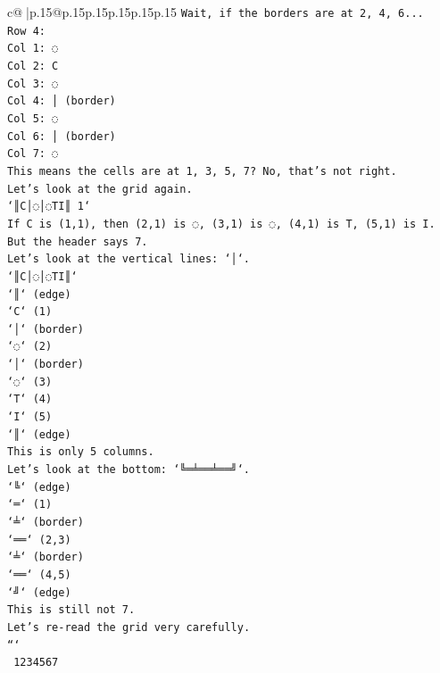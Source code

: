 \documentclass{article}
\begin{document}
{\begin{supertabular}{c@{$\;$}|p{.15\linewidth}@{}p{.15\linewidth}p{.15\linewidth}p{.15\linewidth}p{.15\linewidth}p{.15\linewidth}}
{{{\texttt{Wait, if the borders are at 2, 4, 6...} \\
\texttt{Row 4:} \\
\texttt{Col 1: ◌} \\
\texttt{Col 2: C} \\
\texttt{Col 3: ◌} \\
\texttt{Col 4: │ (border)} \\
\texttt{Col 5: ◌} \\
\texttt{Col 6: │ (border)} \\
\texttt{Col 7: ◌} \\
\texttt{This means the cells are at 1, 3, 5, 7? No, that's not right.} \\
\texttt{Let's look at the grid again.} \\
\texttt{`║C│◌│◌TI║ 1`} \\
\texttt{If C is (1,1), then (2,1) is ◌, (3,1) is ◌, (4,1) is T, (5,1) is I.} \\
\texttt{But the header says 7.} \\
\texttt{Let's look at the vertical lines: `│`.} \\
\texttt{`║C│◌│◌TI║`} \\
\texttt{`║` (edge)} \\
\texttt{`C` (1)} \\
\texttt{`│` (border)} \\
\texttt{`◌` (2)} \\
\texttt{`│` (border)} \\
\texttt{`◌` (3)} \\
\texttt{`T` (4)} \\
\texttt{`I` (5)} \\
\texttt{`║` (edge)} \\
\texttt{This is only 5 columns.} \\
\texttt{Let's look at the bottom: `╚═╧══╧══╝`.} \\
\texttt{`╚` (edge)} \\
\texttt{`═` (1)} \\
\texttt{`╧` (border)} \\
\texttt{`══` (2,3)} \\
\texttt{`╧` (border)} \\
\texttt{`══` (4,5)} \\
\texttt{`╝` (edge)} \\
\texttt{This is still not 7.} \\
\texttt{Let's re{-}read the grid very carefully.} \\
\texttt{```} \\
\texttt{ 1234567} \\
}}}
\end{supertabular}}
\end{document}

